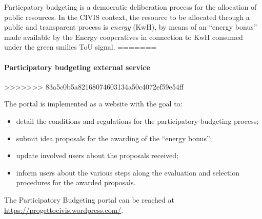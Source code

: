 Particpatory budgeting is a democratic deliberation process for the allocation of public resources. 
In the CIVIS context, the resource to be allocated through a public and transparent process is \emph{energy} (KwH), by means of an ``energy bonus''
made available by the Energy cooperatives in connection to
KwH consumed under the green smilies ToU signal.
=======
\paragraph{Participatory budgeting external service} 
>>>>>>> 83a5c0b5a82168074603134a50c4072ef59e54ff


The portal is implemented as a website with the goal to:
\begin{itemize}
 \item detail the conditions and regulations for the participatory budgeting process;
 \item submit idea proposals for the awarding of the ``energy bonus'';
 \item update involved users about the proposals received;
 \item inform users about the various steps along the evaluation and selection procedures for the awarded proposals. 
\end{itemize}
The Participatory Budgeting portal can be reached at \url{https://progettocivis.wordpress.com/}.

%